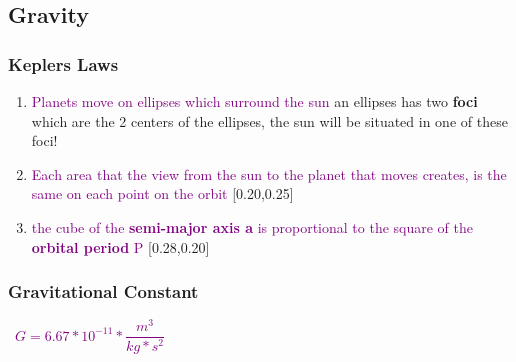 \documentclass[main.tex,fontsize=8pt,paper=a4,paper=portrait,DIV=calc,]{scrartcl}
\begin{document}
\begin{multicols*}{2}
\subsection{Gravity}
\subsubsection{Keplers Laws}
\begin{enumerate}
\item \textcolor{purple}{Planets move on ellipses which surround the sun}\newline
  an ellipses has two \textbf{foci} which are the 2 centers of the ellipses, the sun will be situated in one of these foci!
\item \textcolor{purple}{Each area that the view from the sun to the planet that moves creates, is the same on each point on the orbit}\newline
  [0.20,0.25]
\item \textcolor{purple}{the cube of the \textbf{semi-major axis a} is proportional to the square of the \textbf{orbital period} P}\newline
  [0.28,0.20]
\end{enumerate} 

\subsubsection{Gravitational Constant}
\, \newline
\large \textcolor{purple}{\( G = 6.67 * 10^{-11}*\dfrac{m^3}{kg * s^2} \)}\newline
\, \newline
\normalsize 


\end{multicols*}
\end{document}
